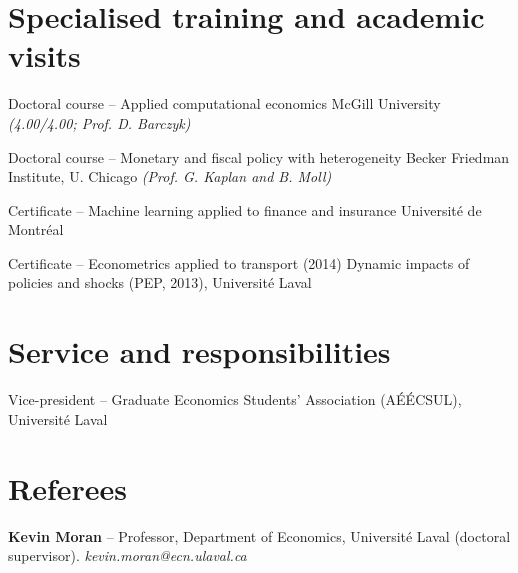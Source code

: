 \documentclass[11pt,letterpaper]{article}
\newenvironment{datelist}
  {\begin{description}[style=multiline,leftmargin=2.75cm,labelwidth=2.55cm,
     labelsep=0.2cm,font=\normalfont\small\color{soft},
     itemsep=0.45em,topsep=0.25em,parsep=0.15em]}
  {\end{description}}
\newcommand{\dotsep}{\;\textcolor{soft}{\textbullet}\;}
\newcommand{\meta}[1]{{\small\itshape\color{soft}#1}}
\begin{document}
\section{Specialised training and academic visits}
\begin{datelist}
  \item[Winter 2020] Doctoral course -- Applied computational economics \dotsep McGill University \meta{(4.00/4.00; Prof. D. Barczyk)}
  \item[Summer 2019] Doctoral course -- Monetary and fiscal policy with heterogeneity \dotsep Becker Friedman Institute, U. Chicago \meta{(Prof. G. Kaplan and B. Moll)}
  \item[2021] Certificate -- Machine learning applied to finance and insurance \dotsep Université de Montréal
  \item[2013--2014] Certificate -- Econometrics applied to transport (2014) \dotsep Dynamic impacts of policies and shocks (PEP, 2013), Université Laval
\end{datelist}
\section{Service and responsibilities}
\begin{datelist}
  \item[2021--2023] Vice-president -- Graduate Economics Students' Association (AÉÉCSUL), Université Laval
\end{datelist}
\section{Referees}
\begin{plainlist}
  \item \textbf{Kevin Moran} -- Professor, Department of Economics, Université Laval (doctoral supervisor). \meta{kevin.moran@ecn.ulaval.ca}
\end{plainlist}
\end{document}
